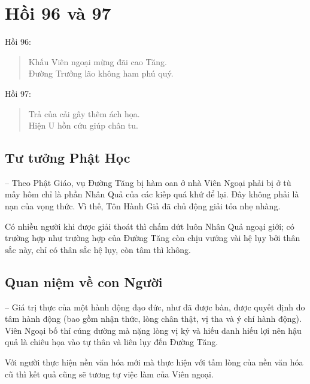 \chapter{Hồi 96 và 97} %
\label{cha:hoi_96_97}

Hồi 96:

\begin{verse}
\begin{itshape}
Khấu Viên ngoại mừng đãi cao Tăng.\\
Đường Trưởng lão không ham phú quý.
\end{itshape}
\end{verse}

Hồi 97:

\begin{verse}
\begin{itshape}
Trả của cải gây thêm ách họa.\\
Hiện U hồn cứu giúp chân tu.
\end{itshape}
\end{verse}

\section{Tư tưởng Phật Học} %
\label{sec:96_97_phat_hoc}

-- Theo Phật Giáo, vụ Đường Tăng bị hàm oan ở nhà Viên Ngoại phải bị ở tù mấy hôm chỉ là phần Nhân Quả của các kiếp quá khứ để lại. Đây không phải là nạn của vọng thức. Vì thế, Tôn Hành Giả đã chủ động giải tỏa nhẹ nhàng.

Có nhiều người khi được giải thoát thì chấm dứt luôn Nhân Quả ngoại giới; có trường hợp như trường hợp của Đường Tăng còn chịu vướng vài hệ lụy bởi thân sắc này, chỉ có thân sắc hệ lụy, còn tâm thì không.

\section{Quan niệm về con Người} %
\label{sec:96_97_con_nguoi}

-- Giá trị thực của một hành động đạo đức, như đã được bàn, được quyết định do tâm hành động (bao gồm nhận thức, lòng chân thật, vị tha và ý chí hành động). Viên Ngoại bố thí cúng dường mà nặng lòng vị kỷ và hiếu danh hiếu lợi nên hậu quả là chiêu họa vào tự thân và liên lụy đến Đường Tăng.

Với người thực hiện nền văn hóa mới mà thực hiện với tấm lòng của nền văn hóa cũ thì kết quả cũng sẽ tương tự việc làm của Viên ngoại.


